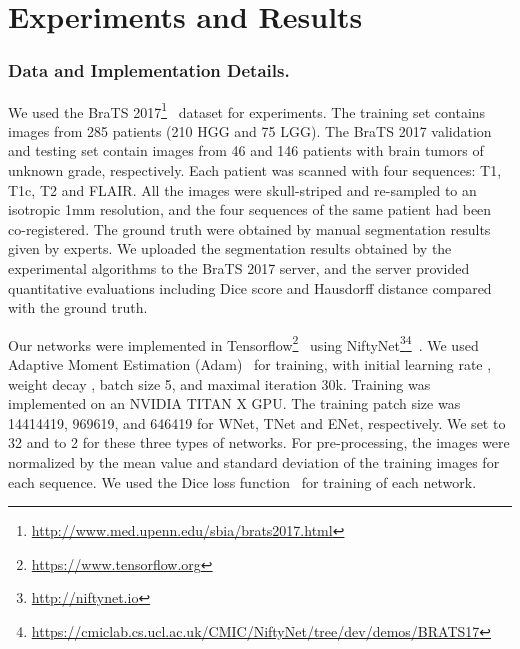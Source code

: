 \documentclass[a4paper,orivec,runningheads]{llncs}
\begin{document}
\section{Experiments and Results}

\subsubsection{Data and Implementation Details.}

We used the BraTS 2017\footnote{\url{http://www.med.upenn.edu/sbia/brats2017.html}}~\cite{Menze2015,Bakas2017,Bakas2017a,Bakas2017b} dataset for experiments. The training set contains images from 285 patients (210 HGG and 75 LGG). The BraTS 2017 validation and testing set contain images from 46 and 146 patients with brain tumors of unknown grade, respectively. Each patient was scanned with four sequences: T1, T1c, T2 and FLAIR. All the images were skull-striped and re-sampled to an isotropic 1mm resolution, and the four sequences of the same patient had been co-registered. The ground truth were obtained by manual segmentation results given by experts. We uploaded the segmentation results obtained by the experimental algorithms to the BraTS 2017 server, and the server provided quantitative evaluations including Dice score and Hausdorff distance compared with the ground truth.

Our networks were implemented in Tensorflow\footnote{\url{https://www.tensorflow.org}}~\cite{Abadi2016} using NiftyNet\footnote{\url{http://niftynet.io}}\footnote{\url{https://cmiclab.cs.ucl.ac.uk/CMIC/NiftyNet/tree/dev/demos/BRATS17}}~\cite{Gibson2017a}. We used Adaptive Moment Estimation (Adam)~\cite{Kingma2015} for training, with initial learning rate , weight decay , batch size 5, and maximal iteration 30k. Training was implemented on
an NVIDIA TITAN X GPU. The training patch size was 14414419, 969619, and 646419 for WNet, TNet and ENet, respectively. We set  to 32 and  to 2 for these three types of networks.  For pre-processing, the images were normalized by the mean value and standard deviation of the training images for each sequence. We used the Dice loss function~\cite{Milletari2016,Fidon2017b} for training of each network.
 
\end{document}
